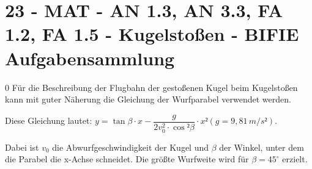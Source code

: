 \section{23 - MAT - AN 1.3, AN 3.3, FA 1.2, FA 1.5 - Kugelstoßen - BIFIE Aufgabensammlung}

\begin{langesbeispiel} \item[0] %
				Für die Beschreibung der Flugbahn der gestoßenen Kugel beim Kugelstoßen kann mit guter Näherung die Gleichung der Wurfparabel verwendet werden.
				
				Diese Gleichung lautet: $y=\tan\beta\cdot x-\dfrac{g}{2v_0^2\cdot \cos²\beta}\cdot x² (g=9,81\,m/s²)$.
				
				Dabei ist $v_0$ die Abwurfgeschwindigkeit der Kugel und $\beta$ der Winkel, unter dem die Parabel die x-Achse schneidet. Die größte Wurfweite wird für $\beta=45^\circ$ erzielt.
				

\end{langesbeispiel}
